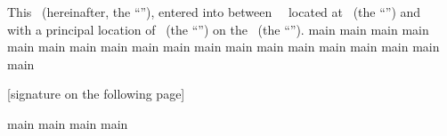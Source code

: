 This \amendmentTitle\ (hereinafter, the “\amendmentTitle”), entered into between \lessorName\, \lessorType\, located at \lessorAddress\ (the “\lessor”) and \lesseeName\, \lesseeType\, with a principal location of \lesseeAddress\ (the “\lessee”) on the \effectiveDateText\ (the “\effectiveDate”).
\blankspace
\blankspace
{main}
\newpage
\tableofcontents
\clearpage
{main}
\newline
{main}
\newline
{main}
\newline
{main}
\newline
{main}
\newline
{main}
\newline
{main}
\newline
{main}
\newline
{main}
\newline
{main}
\newline
{main}
\newline
{main}
\newline
{main}
\newline
{main}
\newline
{main}
\newline
{main}
\newline
{main}
\newline
{main}
\newline
\newline
\newline
\begin{center}
[signature on the following page]
\end{center}
\newpage
{main}
\newpage
{main}
\newpage
{main}
\newpage
{main}
\newpage
